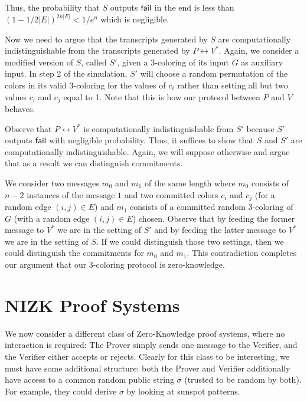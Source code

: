 Thus, the probability that $S$ outputs $\sf{fail}$ in the end is less than $(1 - 1/2|E|)^{2n|E|} < 1/e^n$ which is negligible.

Now we need to argue that the transcripts generated by $S$ are computationally indistinguishable from the transcripts generated by $P \leftrightarrow V^*$. Again, we consider a modified version of $S$, called $S'$, given a 3-coloring of its input $G$ as auxiliary input. In step 2 of the simulation, $S'$ will choose a random permutation of the colors in its valid 3-coloring for the values of $c_i$ rather than setting all but two values $c_i$ and $c_j$ equal to 1. Note that this is how our protocol between $P$ and $V$ behaves.

Observe that $P \leftrightarrow V^*$ is computationally indistinguishable from $S'$ because $S'$ outputs $\sf{fail}$ with negligible probability. Thus, it suffices to show that $S$ and $S'$ are computationally indistinguishable. Again, we will suppose otherwise and argue that as a result we can distinguish commitments.

We consider two messages $m_0$ and $m_1$ of the same length where $m_0$ consists of $n-2$ instances of the message $1$ and two committed colors $c_i$ and $c_j$ (for a random edge $(i, j) \in E$) and $m_1$ consists of a committed random 3-coloring of $G$ (with a random edge $(i, j) \in E$) chosen. Observe that by feeding the former message to $V^*$ we are in the setting of $S'$ and by feeding the latter message to $V^*$ we are in the setting of $S$. If we could distinguish those two settings, then we could distinguish the commitments for $m_0$ and $m_1$. This contradiction completes our argument that our 3-coloring protocol is zero-knowledge.
















\newcommand{\rgets}{\overset{\$}{\gets}}
\section{NIZK Proof Systems}
We now consider a different class of Zero-Knowledge proof systems, where no
interaction is required: The Prover simply sends one message to the Verifier,
and the Verifier either accepts or rejects. Clearly for this class to be
interesting, we must have some additional structure:
both the Prover and Verifier additionally have access to a common random public string
$\sigma$ (trusted to be random by both). For example, they could derive $\sigma$
by looking at sunspot patterns. 

